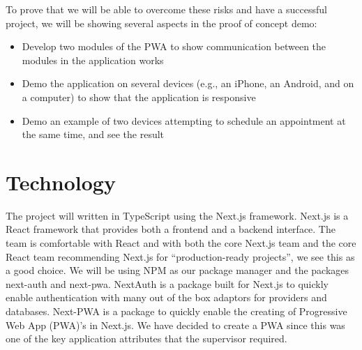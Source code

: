 \documentclass{article}
\begin{document}
To prove that we will be able to overcome these risks and have a successful project, we will be showing 
several aspects in the proof of concept demo:

\begin{itemize}
	\item Develop two modules of the PWA to show communication between the modules in the application works
	\item Demo the application on several devices (e.g., an iPhone, an Android, and on a computer) to show that the application is responsive
	\item Demo an example of two devices attempting to schedule an appointment at the same time, and see the result
\end{itemize}

\section{Technology}


The project will written in TypeScript using the Next.js framework. Next.js is a React framework
that provides both a frontend and a backend interface. The team is comfortable with React and with
both the core Next.js team and the core React team recommending Next.js for
``production-ready projects'', we see this as a good choice. We will be using NPM as our package
manager and the packages next-auth and next-pwa. NextAuth is a package built for Next.js to quickly
enable authentication with many out of the box adaptors for providers and databases. Next-PWA is a
package to quickly enable the creating of Progressive Web App (PWA)'s in Next.js. We have decided to
create a PWA since this was one of the key application attributes that the supervisor required.
\end{document}
